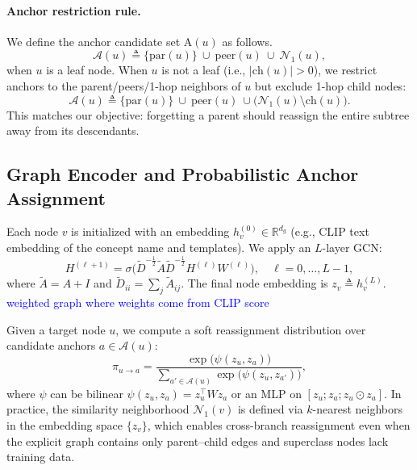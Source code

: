 \paragraph{Anchor restriction rule.}
We define the {anchor candidate set} $\mathrm{A}(u)$ as follows.
\begin{equation}
\mathcal{A}(u) \triangleq \{\mathrm{par}(u)\}\ \cup\ \mathrm{peer}(u)\ \cup\ \mathcal{N}_1(u),
\label{eq:anchor-set-leaf}
\end{equation}
when $u$ is a leaf node.
When $u$ is {not} a leaf (i.e., $|\mathrm{ch}(u)|>0$), we restrict anchors to the parent/peers/1-hop neighbors of $u$ but {exclude 1-hop child nodes}:
\begin{equation}
\mathcal{A}(u) \triangleq \{\mathrm{par}(u)\}\ \cup\ \mathrm{peer}(u)\ \cup\big(\mathcal{N}_1(u)\setminus \mathrm{ch}(u)\big).
\label{eq:anchor-set-nonleaf}
\end{equation}
This matches our objective: forgetting a parent should reassign the entire subtree away from its descendants.

\subsection{Graph Encoder and Probabilistic Anchor Assignment}
\label{sec:gcn}
Each node $v$ is initialized with an embedding $h_v^{(0)}\in\mathbb{R}^{d_g}$ (e.g., CLIP text embedding of the concept name and templates). We apply an $L$-layer GCN:
\begin{equation}
H^{(\ell+1)} = \sigma\!\big(\tilde{D}^{-\frac12}\tilde{A}\tilde{D}^{-\frac12} H^{(\ell)} W^{(\ell)}\big),\quad \ell=0,\dots,L-1,
\end{equation}
where $\tilde{A}=A+I$ and $\tilde{D}_{ii}=\sum_j \tilde{A}_{ij}$. The final node embedding is $z_v\triangleq h_v^{(L)}$. \textcolor{blue}{weighted graph where weights come from CLIP score}

Given a target node $u$, we compute a soft reassignment distribution over candidate anchors $a\in\mathcal{A}(u)$: \textcolor{include graph attention instead of GCN}
\begin{equation}
\pi_{u\rightarrow a} =
\frac{\exp\big(\psi(z_u,z_a)\big)}
{\sum_{a'\in\mathcal{A}(u)} \exp\big(\psi(z_u,z_{a'})\big)},
\label{eq:pi}
\end{equation}
where $\psi$ can be bilinear $\psi(z_u,z_a)=z_u^\top W z_a$ or an MLP on $[z_u;z_a;z_u\odot z_a]$. 
In practice, the similarity neighborhood $\mathcal{N}_1(v)$ is defined
via $k$-nearest neighbors in the embedding space $\{z_v\}$, which enables
cross-branch reassignment even when the explicit graph contains only
parent--child edges and superclass nodes lack training data.

